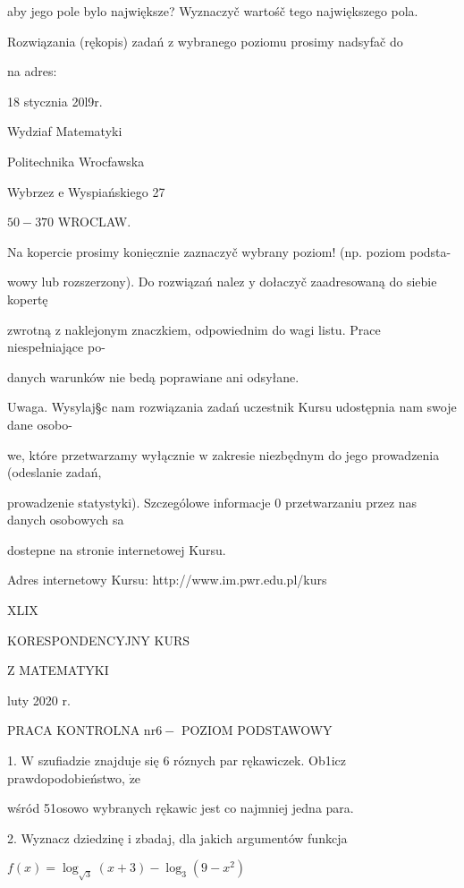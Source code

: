 \documentclass[a4paper,12pt]{article}
\begin{document}
aby jego pole bylo największe? Wyznaczyč wartośč tego największego pola.

Rozwiązania (rękopis) zadań z wybranego poziomu prosimy nadsyfač do

na adres:

18 stycznia 20l9r.

Wydziaf Matematyki

Politechnika Wrocfawska

Wybrzez $\mathrm{e}$ Wyspiańskiego 27

$50-370$ WROCLAW.

Na kopercie prosimy $\underline{\mathrm{k}\mathrm{o}\mathrm{n}\mathrm{i}\mathrm{e}\mathrm{c}\mathrm{z}\mathrm{n}\mathrm{i}\mathrm{e}}$ zaznaczyč wybrany poziom! (np. poziom podsta-

wowy lub rozszerzony). Do rozwiązań nalez $\mathrm{y}$ dołaczyč zaadresowaną do siebie kopertę

zwrotną $\mathrm{z}$ naklejonym znaczkiem, odpowiednim do wagi listu. Prace niespełniające po-

danych warunków nie bedą poprawiane ani odsyłane.

Uwaga. Wysylaj\S c nam rozwiązania zadań uczestnik Kursu udostępnia nam swoje dane osobo-

we, które przetwarzamy wyłącznie $\mathrm{w}$ zakresie niezbędnym do jego prowadzenia (odeslanie zadań,

prowadzenie statystyki). Szczególowe informacje $0$ przetwarzaniu przez nas danych osobowych sa

dostepne na stronie internetowej Kursu.

Adres internetowy Kursu: http://www.im.pwr.edu.pl/kurs







XLIX

KORESPONDENCYJNY KURS

Z MATEMATYKI

luty 2020 r.

PRACA KONTROLNA $\mathrm{n}\mathrm{r} 6-$ POZIOM PODSTAWOWY

1. $\mathrm{W}$ szufiadzie znajduje się 6 róznych par rękawiczek. Ob1icz prawdopodobieństwo, $\dot{\mathrm{z}}\mathrm{e}$

wśród 51osowo wybranych rękawic jest co najmniej jedna para.

2. Wyznacz dziedzinę $\mathrm{i}$ zbadaj, dla jakich argumentów funkcja

$f(x)=\log_{\sqrt{3}}(x+3)-\log_{3}(9-x^{2})$
\end{document}
